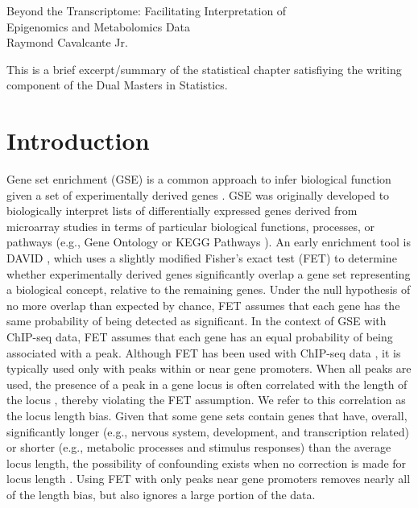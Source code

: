 \documentclass[11pt, oneside]{article}   	%
\begin{document}

\onehalfspace

\begin{center}
\large
Beyond the Transcriptome: Facilitating Interpretation of \\Epigenomics and Metabolomics Data \\\vspace{0.5cm}
\normalsize
Raymond Cavalcante Jr.
\end{center}

\noindent This is a brief excerpt/summary of the statistical chapter satisfiying the writing component of the Dual Masters in Statistics.

\section*{Introduction}
Gene set enrichment (GSE) is a common approach to infer biological function given a set of experimentally derived genes \cite{Draghici:2003uj}. GSE was originally developed to biologically interpret lists of differentially expressed genes derived from microarray studies \cite{Curtis:2005ck} in terms of particular biological functions, processes, or pathways (e.g., Gene Ontology \cite{Ashburner:2000ja} or KEGG Pathways \cite{Kanehisa:2000jn}). An early enrichment tool is DAVID \cite{Huang:2009gk}, which uses a slightly modified Fisher's exact test (FET) to determine whether experimentally derived genes significantly overlap a gene set representing a biological concept, relative to the remaining genes. Under the null hypothesis of no more overlap than expected by chance, FET assumes that each gene has the same probability of being detected as significant. In the context of GSE with ChIP-seq data, FET assumes that each gene has an equal probability of being associated with a peak. Although FET has been used with ChIP-seq data \cite{Blow:2010bu, Han:2013gv}, it is typically used only with peaks within or near gene promoters. When all peaks are used, the presence of a peak in a gene locus is often correlated with the length of the locus \cite{Ovcharenko:2005br}, thereby violating the FET assumption. We refer to this correlation as the locus length bias. Given that some gene sets contain genes that have, overall, significantly longer (e.g., nervous system, development, and transcription related) or shorter (e.g., metabolic processes and stimulus responses) than the average locus length, the possibility of confounding exists when no correction is made for locus length \cite{Taher:2009ko}. Using FET with only peaks near gene promoters removes nearly all of the length bias, but also ignores a large portion of the data.
\end{document}
